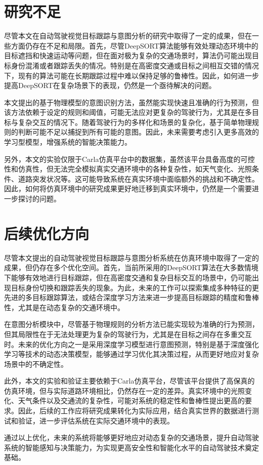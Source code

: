 \section{研究不足}

尽管本文在自动驾驶视觉目标跟踪与意图分析的研究中取得了一定的成果，但在一些方面仍存在不足和局限。首先，尽管DeepSORT算法能够有效处理动态环境中的目标遮挡和快速运动等问题，但在面对极为复杂的交通场景时，算法仍可能出现目标身份混淆或者跟踪丢失的情况。特别是在高密度交通或目标之间相互交错的情况下，现有的算法可能在长期跟踪过程中难以保持足够的鲁棒性。因此，如何进一步提高DeepSORT在复杂场景下的表现，仍然是一个亟待解决的问题。

本文提出的基于物理模型的意图识别方法，虽然能实现快速且准确的行为预测，但该方法依赖于设定的规则和阈值，可能无法应对更复杂的驾驶行为，尤其是在多目标与复杂交互的情况下。随着驾驶行为的多样化和场景的复杂化，基于简单物理规则的判断可能不足以捕捉到所有可能的意图。因此，未来需要考虑引入更多高效的学习型模型，增强系统的智能决策能力。

另外，本文的实验仅限于Carla仿真平台中的数据集，虽然该平台具备高度的可控性和仿真性，但无法完全模拟真实交通环境中的各种复杂性，如天气变化、光照条件、道路突发状况等。这可能导致系统在真实环境中面临额外的挑战和不确定性。因此，如何将仿真环境中的研究成果更好地迁移到真实环境中，仍然是一个需要进一步探讨的问题。


\section{后续优化方向}

尽管本文提出的自动驾驶视觉目标跟踪与意图分析系统在仿真环境中取得了一定的成果，但仍存在多个优化空间。首先，当前所采用的DeepSORT算法在大多数情境下能够有效地进行目标跟踪，但在高密度交通和复杂目标交互的场景中，仍可能出现目标身份切换和跟踪丢失的现象。为此，未来的工作可以探索集成多种特征的更先进的多目标跟踪算法，或结合深度学习方法来进一步提高目标跟踪的精度和鲁棒性，尤其是在动态复杂的交通环境中。

在意图分析模块中，尽管基于物理规则的分析方法已能实现较为准确的行为预测，但其局限性在于无法处理更为复杂的驾驶行为，尤其是在目标之间存在多重交互时。未来的优化方向之一是采用深度学习模型进行意图预测，特别是基于深度强化学习等技术的动态决策模型，能够通过学习优化其决策过程，从而更好地应对复杂场景中的不确定性。

此外，本文的实验和验证主要依赖于Carla仿真平台，尽管该平台提供了高保真的仿真环境，但与实际道路环境相比，仍然存在一定的差异。真实环境中的光照变化、天气条件以及交通流的复杂性，可能对系统的稳定性和鲁棒性提出更高的要求。因此，后续的工作应将研究成果转化为实际应用，结合真实世界的数据进行测试和验证，进一步评估系统在实际交通环境中的表现。

通过以上优化，未来的系统将能够更好地应对动态复杂的交通场景，提升自动驾驶系统的智能感知与决策能力，为实现更高安全性和智能化水平的自动驾驶技术奠定基础。



\begin{tabular}{l l}
\end{tabular}